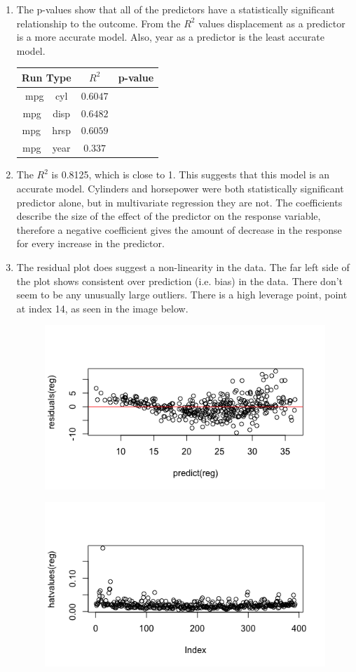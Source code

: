 \begin{enumerate}
	\newpage
	\item  The p-values show that all of the predictors have a statistically significant relationship to the outcome. From the $R^2$ values displacement as a predictor is a more accurate model. Also, year as a predictor is the least accurate model.  
	\newline
	\begin{tabular}{ccc}
		\centering
		Run Type & $R^2$ & p-value \\
		\hline
		mpg ~ cyl & $0.6047$ & \\
		mpg ~ disp & $0.6482$ &  \\
		mpg ~ hrsp & $0.6059$ &  \\
		mpg ~ year & $0.337$ &
	\end{tabular}
	\item The $R^2$ is 0.8125, which is close to 1. This suggests that this model is an accurate model. Cylinders and horsepower were both statistically significant predictor alone, but in multivariate regression they are not. The coefficients describe the size of the effect of the predictor on the response variable, therefore a negative coefficient gives the amount of decrease in the response for every increase in the predictor.
	\item The residual plot does suggest a non-linearity in the data. The far left side of the plot shows consistent over prediction (i.e. bias) in the data. There don't seem to be any unusually large outliers. There is a high leverage point, point at index 14, as seen in the image below. 
	\begin{figure}[htbp]
		\centering
		\includegraphics[width=.8\linewidth]{img/ESL_02_nonlinearity.png}
	\end{figure}
	\begin{figure}[htbp]
		\centering
		\includegraphics[width=.8\linewidth]{img/ESL_02_leverage.png}
	\end{figure}
	

\end{enumerate}
